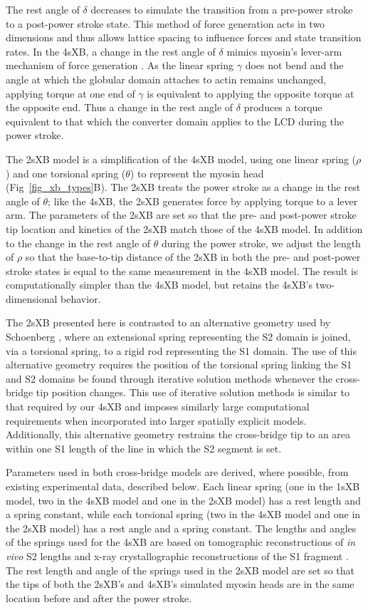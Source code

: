 \documentclass[10pt]{article}
\newcommand{\citep}[1]{\cite{#1}} %
\begin{document}
The rest angle of $\delta$ decreases to simulate the transition from a pre-power stroke to a post-power stroke state.
This method of force generation acts in two dimensions and thus allows lattice spacing to influence forces and state transition rates. 
In the 4sXB, a change in the rest angle of $\delta$ mimics myosin's lever-arm mechanism of force generation \citep{Houdusse2000, Houdusse2001}. 
As the linear spring $\gamma$ does not bend and the angle at which the globular domain attaches to actin remains unchanged, applying torque at one end of $\gamma$ is equivalent to applying the opposite torque at the opposite end.
Thus a change in the rest angle of $\delta$ produces a torque equivalent to that which the converter domain applies to the LCD during the power stroke.

The 2sXB model is a simplification of the 4sXB model, using one linear spring ($\rho$) and one torsional spring ($\theta$) to represent the myosin head (Fig~\ref{fig_xb_types}B).
The 2sXB treats the power stroke as a change in the rest angle of $\theta$; like the 4sXB, the 2sXB generates force by applying torque to a lever arm.
The parameters of the 2sXB are set so that the pre- and post-power stroke tip location and kinetics of the 2sXB match those of the 4sXB model. 
In addition to the change in the rest angle of $\theta$ during the power stroke, we adjust the length of $\rho$ so that the base-to-tip distance of the 2sXB in both the pre- and post-power stroke states is equal to the same measurement in the 4sXB model.
The result is computationally simpler than the 4sXB model, but retains the 4sXB's two-dimensional behavior.

The 2sXB presented here is contrasted to an alternative geometry used by Schoenberg \citep{Schoenberg1980a, Schoenberg1980b}, where an extensional spring representing the S2 domain is joined, via a torsional spring, to a rigid rod representing the S1 domain.
The use of this alternative geometry requires the position of the torsional spring linking the S1 and S2 domains be found through iterative solution methods whenever the cross-bridge tip position changes. 
This use of iterative solution methods is similar to that required by our 4sXB and imposes similarly large computational requirements when incorporated into larger spatially explicit models. 
Additionally, this alternative geometry restrains the cross-bridge tip to an area within one S1 length of the line in which the S2 segment is set.

Parameters used in both cross-bridge models are derived, where possible, from existing experimental data, described below.  
Each linear spring (one in the 1sXB model, two in the 4sXB model and one in the 2sXB model) has a rest length and a spring constant, while each torsional spring (two in the 4sXB model and one in the 2sXB model) has a rest angle and a spring constant. 
The lengths and angles of the springs used for the 4sXB are based on tomographic reconstructions of \emph{in vivo} S2 lengths and x-ray crystallographic reconstructions of the S1 fragment \citep{Taylor1999, Rayment1993}.
The rest length and angle of the springs used in the 2sXB model are set so that the tips of both the 2sXB's and 4sXB's simulated myosin heads are in the same location before and after the power stroke.
\end{document}
